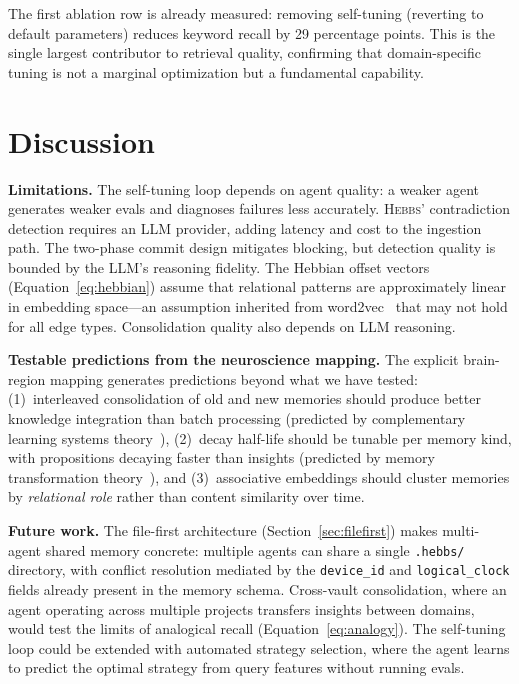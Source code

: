 \documentclass{article}
\begin{document}
The first ablation row is already measured: removing self-tuning (reverting to default parameters) reduces keyword recall by 29 percentage points. This is the single largest contributor to retrieval quality, confirming that domain-specific tuning is not a marginal optimization but a fundamental capability.

\section{Discussion}
\label{sec:discussion}

\textbf{Limitations.} The self-tuning loop depends on agent quality: a weaker agent generates weaker evals and diagnoses failures less accurately. \textsc{Hebbs}' contradiction detection requires an LLM provider, adding latency and cost to the ingestion path. The two-phase commit design mitigates blocking, but detection quality is bounded by the LLM's reasoning fidelity. The Hebbian offset vectors (Equation~\ref{eq:hebbian}) assume that relational patterns are approximately linear in embedding space---an assumption inherited from word2vec~\citep{mikolov2013} that may not hold for all edge types. Consolidation quality also depends on LLM reasoning.

\textbf{Testable predictions from the neuroscience mapping.} The explicit brain-region mapping generates predictions beyond what we have tested: (1)~interleaved consolidation of old and new memories should produce better knowledge integration than batch processing (predicted by complementary learning systems theory~\citep{mcclelland1995}), (2)~decay half-life should be tunable per memory kind, with propositions decaying faster than insights (predicted by memory transformation theory~\citep{winocur2011}), and (3)~associative embeddings should cluster memories by \emph{relational role} rather than content similarity over time.

\textbf{Future work.} The file-first architecture (Section~\ref{sec:filefirst}) makes multi-agent shared memory concrete: multiple agents can share a single \texttt{.hebbs/} directory, with conflict resolution mediated by the \texttt{device\_id} and \texttt{logical\_clock} fields already present in the memory schema. Cross-vault consolidation, where an agent operating across multiple projects transfers insights between domains, would test the limits of analogical recall (Equation~\ref{eq:analogy}). The self-tuning loop could be extended with automated strategy selection, where the agent learns to predict the optimal strategy from query features without running evals.
\end{document}
